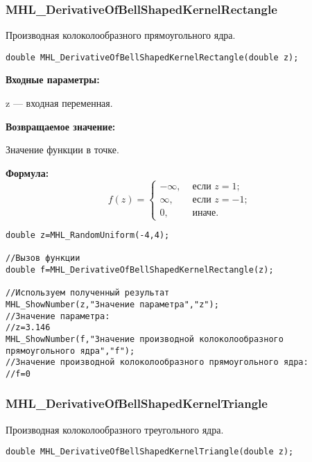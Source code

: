 \documentclass[a4paper,12pt]{article}
\begin{document}
\subsubsection{MHL\_DerivativeOfBellShapedKernelRectangle}\label{MHL_DerivativeOfBellShapedKernelRectangle}

Производная колоколообразного прямоугольного ядра.


\begin{lstlisting}[label=code_syntax_MHL_DerivativeOfBellShapedKernelRectangle,caption=Синтаксис]
double MHL_DerivativeOfBellShapedKernelRectangle(double z);
\end{lstlisting}

\textbf{Входные параметры:}
 
z --- входная переменная.

\textbf{Возвращаемое значение:}
 
Значение функции в точке.

\textbf{Формула:}
\begin{equation*}
f\left(z \right)=\left\lbrace \begin{aligned} -\infty,& \text{ если } z = 1 ; \\\infty,& \text{ если } z = -1 ; \\ 0,& \text{ иначе}. \end{aligned}\right.
\end{equation*}


\begin{lstlisting}[label=code_use_MHL_DerivativeOfBellShapedKernelRectangle,caption=Пример использования]
double z=MHL_RandomUniform(-4,4);

//Вызов функции
double f=MHL_DerivativeOfBellShapedKernelRectangle(z);

//Используем полученный результат
MHL_ShowNumber(z,"Значение параметра","z");
//Значение параметра:
//z=3.146
MHL_ShowNumber(f,"Значение производной колоколообразного прямоугольного ядра","f");
//Значение производной колоколообразного прямоугольного ядра:
//f=0
\end{lstlisting}

\subsubsection{MHL\_DerivativeOfBellShapedKernelTriangle}\label{MHL_DerivativeOfBellShapedKernelTriangle}

Производная колоколообразного треугольного ядра.


\begin{lstlisting}[label=code_syntax_MHL_DerivativeOfBellShapedKernelTriangle,caption=Синтаксис]
double MHL_DerivativeOfBellShapedKernelTriangle(double z);
\end{lstlisting}
\end{document}

